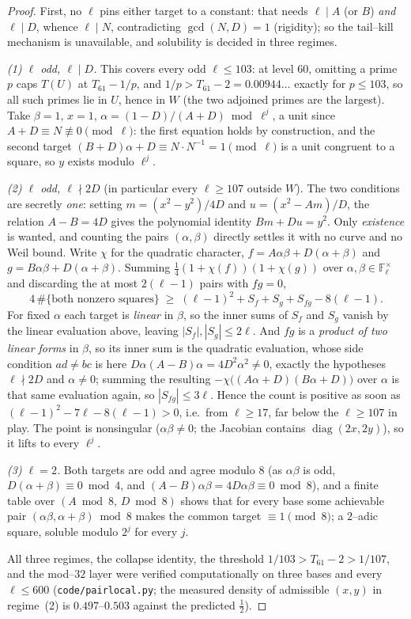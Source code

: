 \documentclass[11pt]{article}
\theoremstyle{definition}
\begin{document}
\begin{proof}
First, no $\ell$ pins either target to a constant: that needs $\ell\mid A$ (or $B$) \emph{and}
$\ell\mid D$, whence $\ell\mid N$, contradicting $\gcd(N,D)=1$ (rigidity); so the tail--kill
mechanism is unavailable, and solubility is decided in three regimes.

\emph{(1) $\ell$ odd, $\ell\mid D$.} This covers every odd $\ell\le103$: at level $60$, omitting a
prime $p$ caps $T(U)$ at $T_{61}-1/p$, and $1/p>T_{61}-2=0.00944\ldots$ exactly for $p\le103$, so
all such primes lie in $U$, hence in $W$ (the two adjoined primes are the largest). Take $\beta=1$,
$x=1$, $\alpha=(1-D)/(A+D)\bmod\ell^j$, a unit since $A+D\equiv N\not\equiv0\pmod\ell$: the first
equation holds by construction, and the second target $(B+D)\alpha+D\equiv N\cdot N^{-1}=1\pmod\ell$
is a unit congruent to a square, so $y$ exists modulo $\ell^j$.

\emph{(2) $\ell$ odd, $\ell\nmid2D$} (in particular every $\ell\ge107$ outside $W$). The two
conditions are secretly \emph{one}: setting $m=(x^2-y^2)/4D$ and $u=(x^2-Am)/D$, the relation
$A-B=4D$ gives the polynomial identity $Bm+Du=y^2$. Only \emph{existence} is wanted, and counting the
pairs $(\alpha,\beta)$ directly settles it with no curve and no Weil bound. Write $\chi$ for the
quadratic character, $f=A\alpha\beta+D(\alpha+\beta)$ and $g=B\alpha\beta+D(\alpha+\beta)$. Summing
$\tfrac14(1+\chi(f))(1+\chi(g))$ over $\alpha,\beta\in\mathbb F_\ell^{\times}$ and discarding the at
most $2(\ell-1)$ pairs with $fg=0$,
\[ 4\,\#\{\text{both nonzero squares}\}\;\ge\;(\ell-1)^2+S_f+S_g+S_{fg}-8(\ell-1). \]
For fixed $\alpha$ each target is \emph{linear} in $\beta$, so the inner sums of $S_f$ and $S_g$
vanish by the linear evaluation above, leaving $|S_f|,|S_g|\le2\ell$. And $fg$ is a \emph{product of
two linear forms} in $\beta$, so its inner sum is the quadratic evaluation, whose side condition
$ad\ne bc$ is here $D\alpha(A-B)\alpha=4D^2\alpha^2\ne0$, exactly the hypotheses
$\ell\nmid2D$ and $\alpha\ne0$; summing the resulting $-\chi\bigl((A\alpha+D)(B\alpha+D)\bigr)$ over
$\alpha$ is that same evaluation again, so $|S_{fg}|\le3\ell$. Hence the count is positive as soon as
$(\ell-1)^2-7\ell-8(\ell-1)>0$, i.e.\ from $\ell\ge17$, far below the $\ell\ge107$ in play. The point
is nonsingular ($\alpha\beta\ne0$; the Jacobian contains $\operatorname{diag}(2x,2y)$), so it lifts
to every $\ell^j$.

\emph{(3) $\ell=2$.} Both targets are odd and agree modulo $8$ (as $\alpha\beta$ is odd,
$D(\alpha+\beta)\equiv0\bmod4$, and $(A-B)\alpha\beta=4D\alpha\beta\equiv0\bmod8$), and a finite
table over $(A\bmod8,\,D\bmod8)$ shows that for every base some achievable pair
$(\alpha\beta,\alpha+\beta)\bmod8$ makes the common target $\equiv1\pmod8$; a $2$--adic square,
soluble modulo $2^j$ for every $j$.

All three regimes, the collapse identity, the threshold $1/103>T_{61}-2>1/107$, and the mod--$32$
layer were verified computationally on three bases and every $\ell\le600$
(\texttt{code/pairlocal.py}; the measured density of admissible $(x,y)$ in regime~(2) is
$0.497$--$0.503$ against the predicted $\tfrac12$).
\end{proof}
\end{document}
